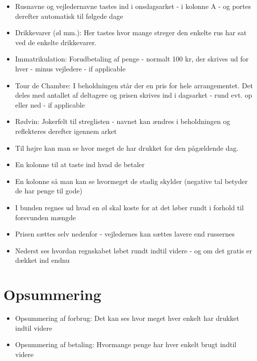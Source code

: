 \documentclass[11pt]{article} %
\begin{document}
\begin{itemize}

\item Rusnavne og vejledernavne tastes ind i onsdagsarket - i kolonne A - og portes derefter automatisk til følgede dage

\item Drikkevarer (øl mm.): Her tastes hvor mange streger den enkelte rus har sat ved de enkelte drikkevarer.

\item Immatrikulation: Forudbetaling af penge - normalt 100 kr, der skrives ud for hver - minus vejledere - if applicable

\item Tour de Chambre: I beholdningen står der en pris for hele arrangementet. Det deles med antallet af deltagere og prisen skrives ind i dagsarket - rund evt. op eller ned - if applicable

\item Rødvin: Jokerfelt til streglisten - navnet kan ændres i beholdningen og reflekteres derefter igennem arket

\item Til højre kan man se hvor meget de har drukket for den pågældende dag.

\item En kolonne til at taste ind hvad de betaler

\item En kolonne så man kan se hvormeget de stadig skylder (negative tal betyder de har penge til gode)

\item I bunden regnes ud hvad en øl skal koste for at det løber rundt i forhold til forsvunden mængde

\item Prisen sættes selv nedenfor - vejledernes kan sættes lavere end russernes

\item Nederst ses hvordan regnskabet løbet rundt indtil videre - og om det gratis er dækket ind endnu

\end{itemize}

\section*{Opsummering}

\begin{itemize}

\item Opsummering af forbrug: Det kan ses hvor meget hver enkelt har drukket indtil videre

\item Opsummering af betaling: Hvormange penge har hver enkelt brugt indtil videre

\end{itemize}
\end{document}
